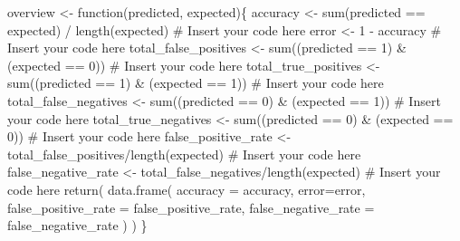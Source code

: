\documentclass[
  letterpaper,
  DIV=11,
  numbers=noendperiod]{scrartcl}
\newenvironment{Shaded}{\begin{snugshade}}{\end{snugshade}}
\newcommand{\AttributeTok}[1]{\textcolor[rgb]{0.40,0.45,0.13}{#1}}
\newcommand{\CommentTok}[1]{\textcolor[rgb]{0.37,0.37,0.37}{#1}}
\newcommand{\ControlFlowTok}[1]{\textcolor[rgb]{0.00,0.23,0.31}{#1}}
\newcommand{\DecValTok}[1]{\textcolor[rgb]{0.68,0.00,0.00}{#1}}
\newcommand{\FunctionTok}[1]{\textcolor[rgb]{0.28,0.35,0.67}{#1}}
\newcommand{\NormalTok}[1]{\textcolor[rgb]{0.00,0.23,0.31}{#1}}
\newcommand{\OtherTok}[1]{\textcolor[rgb]{0.00,0.23,0.31}{#1}}
\newcommand{\SpecialCharTok}[1]{\textcolor[rgb]{0.37,0.37,0.37}{#1}}
\begin{document}
\begin{Shaded}
\begin{Highlighting}[]
\NormalTok{overview }\OtherTok{\textless{}{-}} \ControlFlowTok{function}\NormalTok{(predicted, expected)\{}
\NormalTok{    accuracy }\OtherTok{\textless{}{-}} \FunctionTok{sum}\NormalTok{(predicted }\SpecialCharTok{==}\NormalTok{ expected) }\SpecialCharTok{/} \FunctionTok{length}\NormalTok{(expected) }\CommentTok{\# Insert your code here}
\NormalTok{    error }\OtherTok{\textless{}{-}} \DecValTok{1} \SpecialCharTok{{-}}\NormalTok{ accuracy }\CommentTok{\# Insert your code here}
\NormalTok{    total\_false\_positives }\OtherTok{\textless{}{-}} \FunctionTok{sum}\NormalTok{((predicted }\SpecialCharTok{==} \DecValTok{1}\NormalTok{) }\SpecialCharTok{\&}\NormalTok{ (expected }\SpecialCharTok{==} \DecValTok{0}\NormalTok{)) }\CommentTok{\# Insert your code here}
\NormalTok{    total\_true\_positives }\OtherTok{\textless{}{-}} \FunctionTok{sum}\NormalTok{((predicted }\SpecialCharTok{==} \DecValTok{1}\NormalTok{) }\SpecialCharTok{\&}\NormalTok{ (expected }\SpecialCharTok{==} \DecValTok{1}\NormalTok{)) }\CommentTok{\# Insert your code here}
\NormalTok{    total\_false\_negatives }\OtherTok{\textless{}{-}} \FunctionTok{sum}\NormalTok{((predicted }\SpecialCharTok{==} \DecValTok{0}\NormalTok{) }\SpecialCharTok{\&}\NormalTok{ (expected }\SpecialCharTok{==} \DecValTok{1}\NormalTok{)) }\CommentTok{\# Insert your code here}
\NormalTok{    total\_true\_negatives }\OtherTok{\textless{}{-}} \FunctionTok{sum}\NormalTok{((predicted }\SpecialCharTok{==} \DecValTok{0}\NormalTok{) }\SpecialCharTok{\&}\NormalTok{ (expected }\SpecialCharTok{==} \DecValTok{0}\NormalTok{)) }\CommentTok{\# Insert your code here}
\NormalTok{    false\_positive\_rate }\OtherTok{\textless{}{-}}\NormalTok{ total\_false\_positives}\SpecialCharTok{/}\FunctionTok{length}\NormalTok{(expected) }\CommentTok{\# Insert your code here}
\NormalTok{    false\_negative\_rate }\OtherTok{\textless{}{-}}\NormalTok{ total\_false\_negatives}\SpecialCharTok{/}\FunctionTok{length}\NormalTok{(expected) }\CommentTok{\# Insert your code here}
    \FunctionTok{return}\NormalTok{(}
        \FunctionTok{data.frame}\NormalTok{(}
            \AttributeTok{accuracy =}\NormalTok{ accuracy, }
            \AttributeTok{error=}\NormalTok{error, }
            \AttributeTok{false\_positive\_rate =}\NormalTok{ false\_positive\_rate, }
            \AttributeTok{false\_negative\_rate =}\NormalTok{ false\_negative\_rate}
\NormalTok{        )}
\NormalTok{    )}
\NormalTok{\}}
\end{Highlighting}
\end{Shaded}
\end{document}
